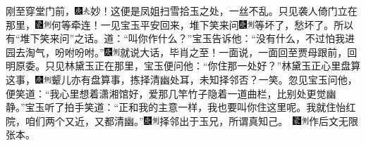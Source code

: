 刚至穿堂门前，{\includegraphics[width=3mm]{../Images/00004}\includegraphics[width=3mm]{../Images/00012}\footnotesize \kaishu 妙！这便是凤姐扫雪拾玉之处，一丝不乱。}只见袭人倚门立在那里，{\includegraphics[width=3mm]{../Images/00006}\includegraphics[width=3mm]{../Images/00011}\footnotesize \kaishu 何等牵连！}一见宝玉平安回来，堆下笑来问{\includegraphics[width=3mm]{../Images/00004}\includegraphics[width=3mm]{../Images/00011}\footnotesize \kaishu 等坏了，愁坏了。所以有``堆下笑来问''之话。}道：``叫你作什么？''宝玉告诉他：``没有什么，不过怕我进园去淘气，吩咐吩咐。''{\includegraphics[width=3mm]{../Images/00004}\includegraphics[width=3mm]{../Images/00011}\footnotesize \kaishu 就说大话，毕肖之至！}一面说，一面回至贾母跟前，回明原委。只见林黛玉正在那里，宝玉便问他：``你住那一处好？''林黛玉正心里盘算这事，{\includegraphics[width=3mm]{../Images/00004}\includegraphics[width=3mm]{../Images/00011}\footnotesize \kaishu 颦儿亦有盘算事，拣择清幽处耳，未知择邻否？一笑。}忽见宝玉问他，便笑道：``我心里想着潇湘馆好，爱那几竿竹子隐着一道曲栏，比别处更觉幽静。''宝玉听了拍手笑道：``正和我的主意一样，我也要叫你住这里呢。我就住怡红院，咱们两个又近，又都清幽。''{{\includegraphics[width=3mm]{../Images/00004}\includegraphics[width=3mm]{../Images/00011}\footnotesize \kaishu 择邻出于玉兄，所谓真知己。　}\includegraphics[width=3mm]{../Images/00006}\includegraphics[width=3mm]{../Images/00011}\footnotesize \kaishu 作后文无限张本。}

